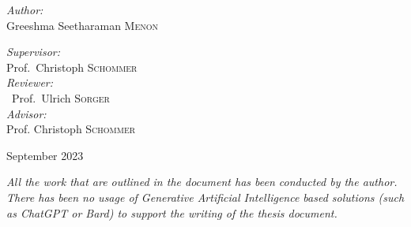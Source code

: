 \begin{titlepage}
\begin{center}
\vspace{4cm}
\begin{minipage}[t]{0.4\textwidth}
\begin{flushleft} \large
\emph{Author:}\\
Greeshma Seetharaman \textsc{Menon}
\end{flushleft}
\end{minipage}
\begin{minipage}[t]{0.4\textwidth}
\begin{flushright} \large
\emph{Supervisor:} \\
Prof.~Christoph \textsc{Schommer} \\
\vspace{.5em}
\emph{Reviewer:} \\
~Prof.~Ulrich \textsc{Sorger} \\
\vspace{.5em}
\emph{Advisor:} \\
Prof. Christoph \textsc{Schommer}
\end{flushright}
\end{minipage}

\vfill

{\large September 2023}

\end{center}

\end{titlepage}


\vspace*{\fill}
\textit{All the work that are outlined in the document has been conducted by the author. There has been no usage of Generative Artificial Intelligence based solutions (such as ChatGPT or Bard) to support the writing of the thesis document. }
\vspace*{\fill}

\begin{center}

\end{center}
